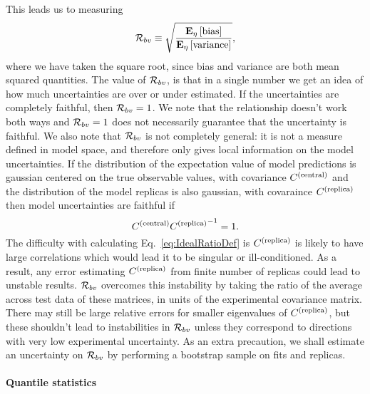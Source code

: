 This leads us to measuring
\begin{equation}\label{eq:RatioDef}
    \mathcal{R}_{bv} \equiv \sqrt{\frac{\mathbf{E}_{\eta}\left[ {\rm bias} \right]}{\mathbf{E}_{\eta}\left[ {\rm variance} \right]}},
\end{equation}
where we have taken the square root, since bias and variance are both mean
squared quantities. The value of $\mathcal{R}_{bv}$, is that in a single
number we get an idea of how much uncertainties are over or under estimated.
If the uncertainties are completely faithful, then $\mathcal{R}_{bv} = 1$. We
note that the relationship doesn't work both ways and $\mathcal{R}_{bv} = 1$ does
not necessarily guarantee that the uncertainty is faithful. We also note
that $\mathcal{R}_{bv}$ is not completely general: it is not a measure defined in
model space, and therefore only gives local information on the model
uncertainties. If the distribution of the expectation value of model predictions
is gaussian centered on the true observable values, with covariance $C^{(\rm central)}$
and the distribution of the model replicas is also gaussian, with covaraince
$C^{(\rm replica)}$ then model uncertainties are faithful if
\begin{equation}\label{eq:IdealRatioDef}
    C^{(\rm central)} {C^{(\rm replica)}}^{-1} = 1.
\end{equation}
The difficulty with calculating Eq.~\ref{eq:IdealRatioDef} is $C^{(\rm replica)}$ is likely
to have large correlations which would lead it to be singular or ill-conditioned.
As a result, any
error estimating $C^{(\rm replica)}$ from finite number of replicas could lead to
unstable results. $\mathcal{R}_{bv}$ overcomes this instability by taking the ratio
of the average across test data of these matrices, in units of the experimental
covariance matrix. There may still be large relative errors for smaller
eigenvalues of $C^{(\rm replica)}$, but these shouldn't lead to instabilities in
$\mathcal{R}_{bv}$ unless they correspond to directions with very low experimental
uncertainty. As an extra precaution, we shall estimate an uncertainty on
$\mathcal{R}_{bv}$ by performing a bootstrap sample on fits and replicas.

\paragraph{Quantile statistics}


